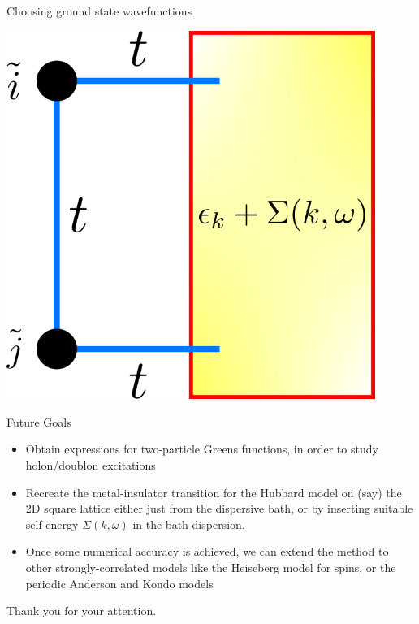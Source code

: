 \documentclass[aspectratio=169]{beamer}
\begin{document}
\begin{frame}{Choosing ground state wavefunctions}
\begin{itemize}
{\begin{minipage}{0.25\textwidth}
			\includegraphics[width=0.9\textwidth]{./dimer_dispersion_selfenergy.png}
		\end{minipage}
	}
\end{itemize}
\end{frame}

\begin{frame}{Future Goals}
	\begin{itemize}
		\item Obtain expressions for two-particle Greens functions, in order to study holon/doublon excitations
		\item Recreate the metal-insulator transition for the Hubbard model on (say) the 2D square lattice either just from the dispersive bath, or by inserting suitable self-energy $\Sigma(k,\omega)$ in the bath dispersion.
		\item Once some numerical accuracy is achieved, we can extend the method to other strongly-correlated models like the Heiseberg model for spins, or the periodic Anderson and Kondo models
	\end{itemize}
\end{frame}

\begin{frame}
	\begin{center}
	\Large
	Thank you for your attention.
	\end{center}
\end{frame}
\end{document}
